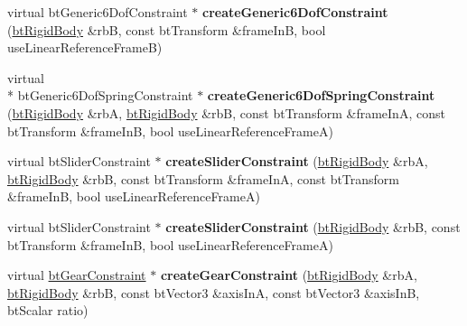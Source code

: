 \begin{DoxyCompactItemize}
\item 
\hypertarget{classbt_world_importer_ad79c71cfc4d9f815fa04480c8b1e30bb}{virtual bt\+Generic6\+Dof\+Constraint $\ast$ {\bfseries create\+Generic6\+Dof\+Constraint} (\hyperlink{classbt_rigid_body}{bt\+Rigid\+Body} \&rb\+B, const bt\+Transform \&frame\+In\+B, bool use\+Linear\+Reference\+Frame\+B)}\label{classbt_world_importer_ad79c71cfc4d9f815fa04480c8b1e30bb}

\item 
\hypertarget{classbt_world_importer_a7a5acffcfaae75af2d89c2b3e2d623cc}{virtual \\*
bt\+Generic6\+Dof\+Spring\+Constraint $\ast$ {\bfseries create\+Generic6\+Dof\+Spring\+Constraint} (\hyperlink{classbt_rigid_body}{bt\+Rigid\+Body} \&rb\+A, \hyperlink{classbt_rigid_body}{bt\+Rigid\+Body} \&rb\+B, const bt\+Transform \&frame\+In\+A, const bt\+Transform \&frame\+In\+B, bool use\+Linear\+Reference\+Frame\+A)}\label{classbt_world_importer_a7a5acffcfaae75af2d89c2b3e2d623cc}

\item 
\hypertarget{classbt_world_importer_af3efce1507b2752b6759c1a5942a887c}{virtual bt\+Slider\+Constraint $\ast$ {\bfseries create\+Slider\+Constraint} (\hyperlink{classbt_rigid_body}{bt\+Rigid\+Body} \&rb\+A, \hyperlink{classbt_rigid_body}{bt\+Rigid\+Body} \&rb\+B, const bt\+Transform \&frame\+In\+A, const bt\+Transform \&frame\+In\+B, bool use\+Linear\+Reference\+Frame\+A)}\label{classbt_world_importer_af3efce1507b2752b6759c1a5942a887c}

\item 
\hypertarget{classbt_world_importer_a35ca419cc26d97737e61de84536577d2}{virtual bt\+Slider\+Constraint $\ast$ {\bfseries create\+Slider\+Constraint} (\hyperlink{classbt_rigid_body}{bt\+Rigid\+Body} \&rb\+B, const bt\+Transform \&frame\+In\+B, bool use\+Linear\+Reference\+Frame\+A)}\label{classbt_world_importer_a35ca419cc26d97737e61de84536577d2}

\item 
\hypertarget{classbt_world_importer_a95f89d7e78f7b9442c77807c0726fbce}{virtual \hyperlink{classbt_gear_constraint}{bt\+Gear\+Constraint} $\ast$ {\bfseries create\+Gear\+Constraint} (\hyperlink{classbt_rigid_body}{bt\+Rigid\+Body} \&rb\+A, \hyperlink{classbt_rigid_body}{bt\+Rigid\+Body} \&rb\+B, const bt\+Vector3 \&axis\+In\+A, const bt\+Vector3 \&axis\+In\+B, bt\+Scalar ratio)}\label{classbt_world_importer_a95f89d7e78f7b9442c77807c0726fbce}

\end{DoxyCompactItemize}
